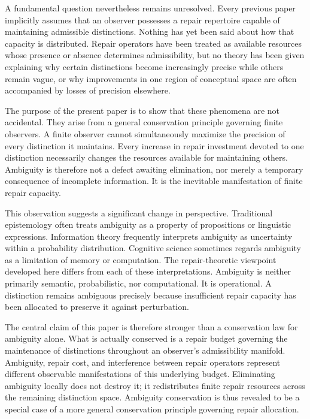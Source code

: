 \documentclass[12pt,oneside]{article}
\theoremstyle{plain}
\theoremstyle{definition}
\theoremstyle{remark}
\begin{document}
A fundamental question nevertheless remains unresolved. Every previous paper implicitly assumes that an observer possesses a repair repertoire capable of maintaining admissible distinctions. Nothing has yet been said about how that capacity is distributed. Repair operators have been treated as available resources whose presence or absence determines admissibility, but no theory has been given explaining why certain distinctions become increasingly precise while others remain vague, or why improvements in one region of conceptual space are often accompanied by losses of precision elsewhere.

The purpose of the present paper is to show that these phenomena are not accidental. They arise from a general conservation principle governing finite observers. A finite observer cannot simultaneously maximize the precision of every distinction it maintains. Every increase in repair investment devoted to one distinction necessarily changes the resources available for maintaining others. Ambiguity is therefore not a defect awaiting elimination, nor merely a temporary consequence of incomplete information. It is the inevitable manifestation of finite repair capacity.

This observation suggests a significant change in perspective. Traditional epistemology often treats ambiguity as a property of propositions or linguistic expressions. Information theory frequently interprets ambiguity as uncertainty within a probability distribution. Cognitive science sometimes regards ambiguity as a limitation of memory or computation. The repair-theoretic viewpoint developed here differs from each of these interpretations. Ambiguity is neither primarily semantic, probabilistic, nor computational. It is operational. A distinction remains ambiguous precisely because insufficient repair capacity has been allocated to preserve it against perturbation.

The central claim of this paper is therefore stronger than a conservation law for ambiguity alone. What is actually conserved is a repair budget governing the maintenance of distinctions throughout an observer's admissibility manifold. Ambiguity, repair cost, and interference between repair operators represent different observable manifestations of this underlying budget. Eliminating ambiguity locally does not destroy it; it redistributes finite repair resources across the remaining distinction space. Ambiguity conservation is thus revealed to be a special case of a more general conservation principle governing repair allocation.
\end{document}
